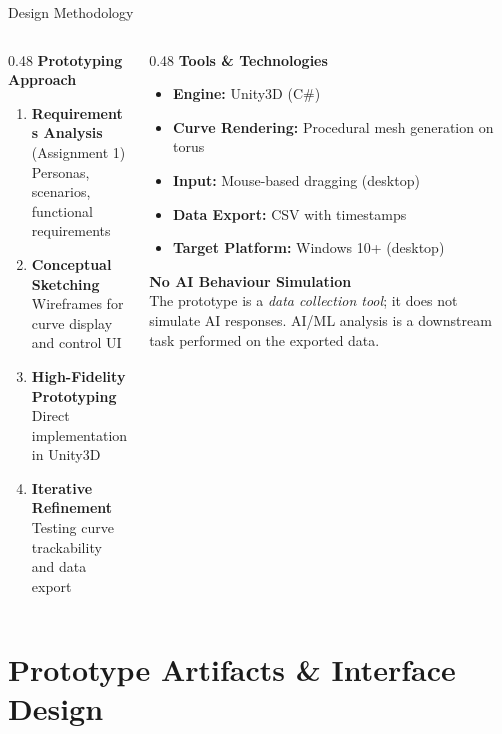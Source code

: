 \documentclass[aspectratio=169, 10pt]{beamer}
\begin{document}
\begin{frame}{Design Methodology}
  \begin{columns}[T]
    \begin{column}{0.48\textwidth}
      \textbf{Prototyping Approach}
      \begin{enumerate}
        \item \textbf{Requirements Analysis} (Assignment 1)\\
              Personas, scenarios, functional requirements
        \item \textbf{Conceptual Sketching}\\
              Wireframes for curve display and control UI
        \item \textbf{High-Fidelity Prototyping}\\
              Direct implementation in Unity3D
        \item \textbf{Iterative Refinement}\\
              Testing curve trackability and data export
      \end{enumerate}
    \end{column}
    \begin{column}{0.48\textwidth}
      \textbf{Tools \& Technologies}
      \begin{itemize}
        \item \textbf{Engine:} Unity3D (C\#)
        \item \textbf{Curve Rendering:} Procedural mesh generation on torus
        \item \textbf{Input:} Mouse-based dragging (desktop)
        \item \textbf{Data Export:} CSV with timestamps
        \item \textbf{Target Platform:} Windows 10+ (desktop)
      \end{itemize}

      \vspace{0.5em}
      \textbf{No AI Behaviour Simulation}\\
      The prototype is a \emph{data collection tool}; it does not simulate AI responses. AI/ML analysis is a downstream task performed on the exported data.
    \end{column}
  \end{columns}
\end{frame}

\section{Prototype Artifacts \& Interface Design}
\end{document}

